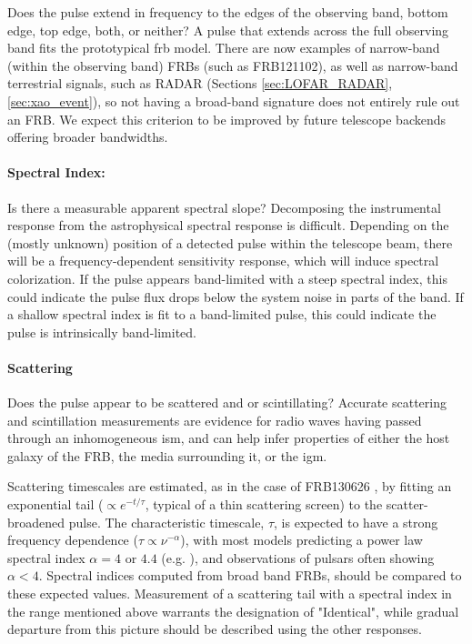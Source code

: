 \documentclass[a4paper,fleqn,usenatbib]{mnras}
\begin{document}
Does the pulse extend in frequency to the edges of the observing band, bottom
edge, top edge, both, or neither? A pulse that extends across the full observing
band fits the prototypical \gls{frb} model. There are now examples of
narrow-band (within the observing band) FRBs (such as FRB121102), as well as
narrow-band terrestrial signals, such as RADAR (Sections \ref{sec:LOFAR_RADAR},
\ref{sec:xao_event}), so not having a broad-band signature does not entirely
rule out an FRB. We expect this criterion to be improved by future telescope
backends offering broader bandwidths. 

\paragraph{Spectral Index:}

Is there a measurable apparent spectral slope? Decomposing the instrumental
response from the astrophysical spectral response is difficult.  Depending on
the (mostly unknown) position of a detected pulse within the telescope beam,
there will be a frequency-dependent sensitivity response, which will induce
spectral colorization.  If the pulse appears band-limited with a steep spectral
index, this could indicate the pulse flux drops below the system noise in parts
of the band. If a shallow spectral index is fit to a band-limited pulse, this
could indicate the pulse is intrinsically band-limited.

\paragraph{Scattering}

Does the pulse appear to be scattered and or scintillating?  Accurate scattering
and scintillation measurements are evidence for radio waves having
passed through an inhomogeneous \gls{ism}, and can help infer properties of
either the host galaxy of the FRB,  the media surrounding it, or the \gls{igm}.

Scattering timescales are estimated, as in the case of FRB130626
\citep{2016MNRAS.460L..30C}, by fitting an exponential tail ($\propto
e^{-t/\tau}$, typical of a thin scattering screen) to the scatter-broadened
pulse. The characteristic timescale, $\tau$, is expected to have a strong
frequency dependence ($\tau \propto \nu^{-\alpha}$), with most models predicting
a power law spectral index $\alpha =4$ or $4.4$ (e.g. \citealt{Rickett1977}), and observations of pulsars often showing $\alpha < 4$.
Spectral indices computed from broad band FRBs, should be compared to these
expected values. Measurement of a scattering tail with a spectral index in the range mentioned above warrants the designation of "Identical", while gradual departure from this picture should be described using the other responses. 
\end{document}
